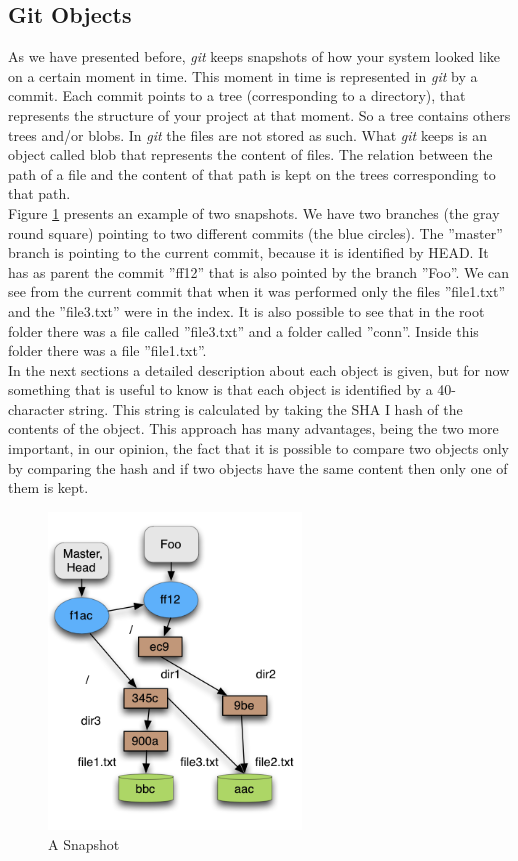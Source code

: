 \subsection{Git Objects}
As we have presented before, \emph{git} keeps snapshots of how your system
looked like on a certain moment in time. This moment in time is
represented in \emph{git} by a commit. Each commit points to a tree
(corresponding to a directory), that
represents the structure of your project at that moment. So a tree
contains others trees and/or blobs. In \emph{git} the files are not stored as such. 
What \emph{git} keeps is an object called blob that represents the content of files. The
relation between the path of a file and the content of that path 
is kept on the trees corresponding to that path. \\

Figure \ref{fig:snapshot} presents an example of two snapshots. We
have two branches (the gray round square) pointing to two different
commits (the blue circles). The ''master'' branch is pointing to the
current commit, because it is identified by HEAD. It has as parent the commit ''ff12''
that is also pointed by the branch ''Foo''. We can see from the current
commit that when it was performed only the files ''file1.txt'' and the
''file3.txt'' were
in the index. It is also possible to see that in the root folder there was
a file called ''file3.txt'' and a folder called ''conn''. Inside this
folder there was a file ''file1.txt''.\\

In the next sections a detailed description about each object is
given, but for now something that is useful to know is that each
object is identified by a 40-character string. This string is
calculated by taking the SHA I hash of the contents of the object.
This approach has many advantages, being the two more important, in our
opinion, the
fact that it is possible to compare two objects only by comparing the hash and
if two objects have the same content then only one of them is kept.

\begin{figure}[h]
   \centering
   \includegraphics[width=0.6\textwidth]{images/object_assoc.png}
   \caption{A Snapshot}
   \label{fig:snapshot}
\end{figure}

